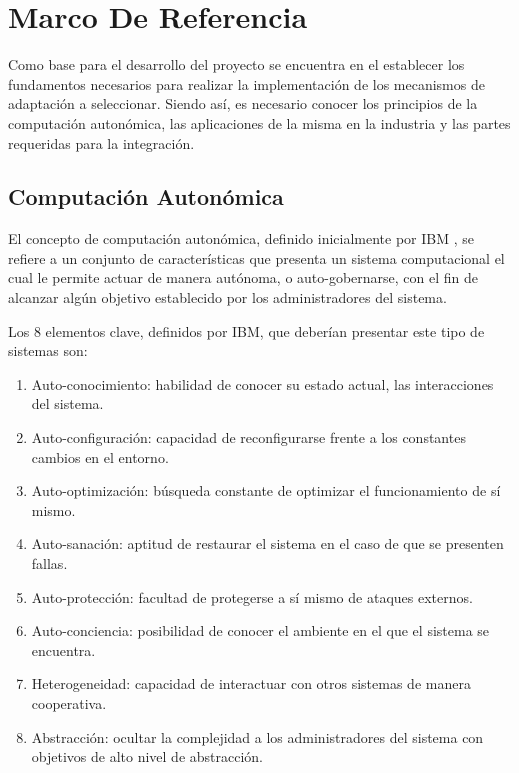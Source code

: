 \documentclass[12pt]{article}
\begin{document}
    \pagebreak

    \section{Marco De Referencia}

    Como base para el desarrollo del proyecto se encuentra en el establecer los fundamentos necesarios para realizar la implementación de los mecanismos de adaptación a seleccionar. Siendo así, es necesario conocer los principios de la computación autonómica, las aplicaciones de la misma en la industria y las partes requeridas para la integración.

    \subsection{Computación Autonómica}
    

    El concepto de computación autonómica, definido inicialmente por IBM \citeyear{horn_2001}, se refiere a un conjunto de características que presenta un sistema computacional el cual le permite actuar de manera autónoma, o auto-gobernarse, con el fin de alcanzar algún objetivo establecido por los administradores del sistema.


    Los 8 elementos clave, definidos por IBM, que deberían presentar este tipo de sistemas son:
    \begin{multicols}{2}
    \begin{enumerate}
        \item Auto-conocimiento: habilidad de conocer su estado actual, las interacciones del sistema.
        \item Auto-configuración: capacidad de reconfigurarse frente a los constantes cambios en el entorno.
        \item Auto-optimización: búsqueda constante de optimizar el funcionamiento de sí mismo.
        \item Auto-sanación: aptitud de restaurar el sistema en el caso de que se presenten fallas.
        \item Auto-protección: facultad de protegerse a sí mismo de ataques externos.
        \item Auto-conciencia: posibilidad de conocer el ambiente en el que el sistema se encuentra.
        \item Heterogeneidad: capacidad de interactuar con otros sistemas de manera cooperativa.
        \item Abstracción: ocultar la complejidad a los administradores del sistema con objetivos de alto nivel de abstracción.
    \end{enumerate}
    \end{multicols}
\end{document}
